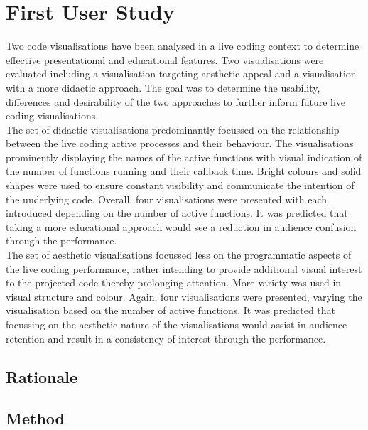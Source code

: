 
\chapter{First User Study}
\label{cha:experimentone}

Two code visualisations have been analysed in a live coding context to determine effective presentational and educational features. Two visualisations were evaluated including a visualisation targeting aesthetic appeal and a visualisation with a more didactic approach. The goal was to determine the usability, differences and desirability of the two approaches to further inform future live coding visualisations.\\

The set of didactic visualisations predominantly focussed on the relationship between the live coding active processes and their behaviour. The visualisations prominently displaying the names of the active functions with visual indication of the number of functions running and their callback time. Bright colours and solid shapes were used to ensure constant visibility and communicate the intention of the underlying code. Overall, four visualisations were presented with each introduced depending on the number of active functions. It was predicted that taking a more educational approach would see a reduction in audience confusion through the performance.\\

The set of aesthetic visualisations focussed less on the programmatic aspects of the live coding performance, rather intending to provide additional visual interest to the projected code thereby prolonging attention. More variety was used in visual structure and colour. Again, four visualisations were presented, varying the visualisation based on the number of active functions. It was predicted that focussing on the aesthetic nature of the visualisations would assist in audience retention and result in a consistency of interest through the performance.

\section{Rationale}
\label{sec:experimenttworationale}

\section{Method}

